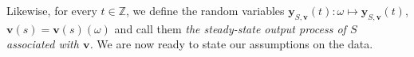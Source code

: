 \documentclass{ifacconf}
\def\rs{{\textnormal{s}}}
\def\rvs{{\mathbf{s}}}
\def\rvv{{\mathbf{v}}}
\def\rvy{{\mathbf{y}}}
\def\vs{{\bm{s}}}
\def\vv{{\bm{v}}}
\def\sZ{{\mathbb{Z}}}
\begin{document}
Likewise, 
for every $t \in \sZ$, we define the random variables $\rvy_{S,\rvv}(t):\omega\mapsto\rvy_{S,\vv}(t)$, $\vv(s)=\rvv(s)(\omega)$ 
and call them
\emph{the steady-state output process 
of $S$ associated with $\rvv$.}
We are now ready to state our assumptions
on the data. 
\end{document}
